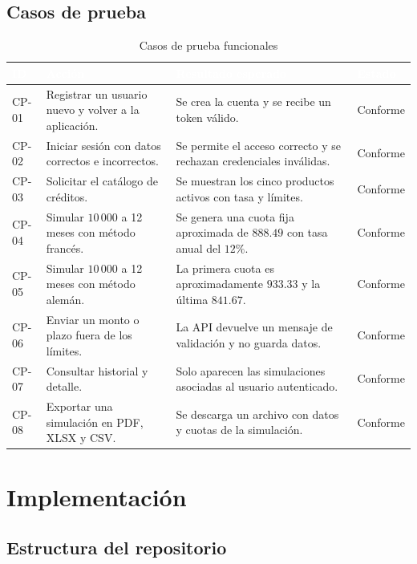 \documentclass[12pt,a4paper]{article}
\begin{document}
\subsection{Casos de prueba}

\begin{table}[H]
\centering
\caption{Casos de prueba funcionales}
\begin{tabularx}{\textwidth}{>{\centering\arraybackslash}p{1.4cm} X X >{\centering\arraybackslash}p{1.7cm}}
\toprule
\rowcolor{black}
\textcolor{white}{\textbf{ID}} & \textcolor{white}{\textbf{Acción}} & \textcolor{white}{\textbf{Resultado esperado}} & \textcolor{white}{\textbf{Estado}} \\
\midrule
CP-01 & Registrar un usuario nuevo y volver a la aplicación. & Se crea la cuenta y se recibe un token válido. & Conforme \\
CP-02 & Iniciar sesión con datos correctos e incorrectos. & Se permite el acceso correcto y se rechazan credenciales inválidas. & Conforme \\
CP-03 & Solicitar el catálogo de créditos. & Se muestran los cinco productos activos con tasa y límites. & Conforme \\
CP-04 & Simular $10\,000$ a 12 meses con método francés. & Se genera una cuota fija aproximada de $888.49$ con tasa anual del $12\%$. & Conforme \\
CP-05 & Simular $10\,000$ a 12 meses con método alemán. & La primera cuota es aproximadamente $933.33$ y la última $841.67$. & Conforme \\
CP-06 & Enviar un monto o plazo fuera de los límites. & La API devuelve un mensaje de validación y no guarda datos. & Conforme \\
CP-07 & Consultar historial y detalle. & Solo aparecen las simulaciones asociadas al usuario autenticado. & Conforme \\
CP-08 & Exportar una simulación en PDF, XLSX y CSV. & Se descarga un archivo con datos y cuotas de la simulación. & Conforme \\
\bottomrule
\end{tabularx}
\end{table}

\section{Implementación}

\subsection{Estructura del repositorio}
\end{document}
